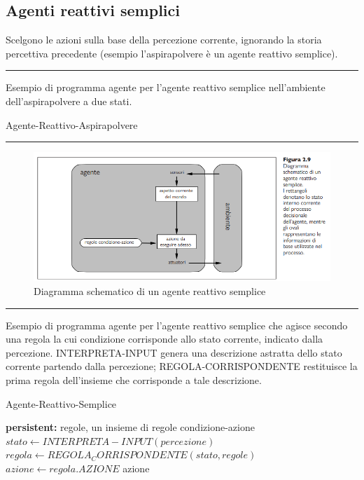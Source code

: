 \documentclass{article}
\begin{document}
\subsection{Agenti reattivi semplici}
Scelgono le azioni sulla base della percezione corrente, ignorando la storia percettiva precedente (esempio l'aspirapolvere è un agente reattivo semplice).
\par\noindent\rule{\textwidth}{0.4pt}
\noindent Esempio di programma agente per l'agente reattivo semplice nell'ambiente dell'aspirapolvere a due stati.
\begin{center}
\begin{algorithm}
\caption{Agente-Reattivo-Aspirapolvere}
{}
{}
\end{algorithm}
\end{center}
\par\noindent\rule{\textwidth}{0.4pt}
\begin{figure}[H]
    \centering
    \includegraphics[width=0.5\linewidth]{Images/diagrammaAgenteReattivoSemplice.png}
    \caption{Diagramma schematico di un agente reattivo semplice}
    \label{fig:enter-label}
\end{figure}
\par\noindent\rule{\textwidth}{0.4pt}
\noindent Esempio di programma agente per l'agente reattivo semplice che agisce secondo una regola la cui condizione corrisponde allo stato corrente, indicato dalla percezione. INTERPRETA-INPUT genera una descrizione astratta dello stato corrente partendo dalla percezione; REGOLA-CORRISPONDENTE restituisce la prima regola dell'insieme che corrisponde a tale descrizione.
\begin{center}
\begin{algorithm}
\caption{Agente-Reattivo-Semplice}
\textbf{persistent: }regole, un insieme di regole condizione-azione\;
$stato \leftarrow INTERPRETA-INPUT(percezione)$\;
$regola \leftarrow REGOLA_CORRISPONDENTE(stato, regole)$\;
$azione \leftarrow regola.AZIONE$\;
\Return azione
\end{algorithm}
\end{center}
\end{document}
